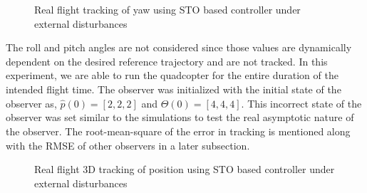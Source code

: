 \documentclass[letterpaper%
, twoside%
, 12pt%
,memoire%
, english%
,creativecommons,hyperref%
]{thETS}
\theoremstyle{newThmStyle}
\begin{document}
\begin{figure}[H]
	\centering
	\parbox{0.75\textwidth}{\caption{Real flight tracking of yaw using STO based controller under external disturbances\label{Fig:yawtracSTODist}}}
\end{figure}
The roll and pitch angles are not considered since those values are dynamically dependent on the desired reference trajectory and are not tracked. In this experiment, we are able to run the quadcopter for the entire duration of the intended flight time. The observer was initialized with the initial state of the observer as, $\hat{p}(0)=[2,2,2]$ and $\hat{\Theta}(0)=[4,4,4]$. This incorrect state of the observer was set similar to the simulations to test the real asymptotic nature of the observer. The root-mean-square of the error in tracking is mentioned along with the RMSE of other observers in a later subsection.
\begin{figure}[H]
	\centering
	\parbox{0.75\textwidth}{\caption{Real flight 3D tracking of position using STO based controller under external disturbances\label{Fig:3dSTODist}}}
\end{figure}
\end{document}
